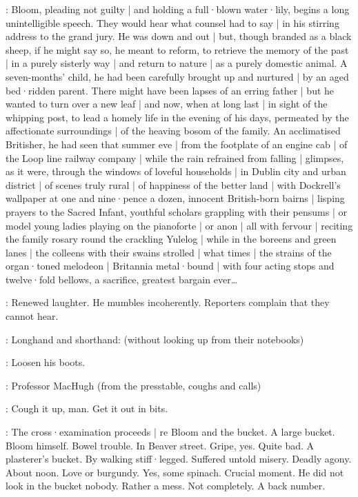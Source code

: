 :
Bloom,
pleading not guilty |
and holding a full·blown water·lily,
begins a long unintelligible speech.
They would hear what counsel had to say |
in his stirring address to the grand jury.
He was down and out |
but,
though branded as a black sheep,
if he might say so,
he meant to reform,
to retrieve the memory of the past |
in a purely sisterly way |
and return to nature |
as a purely domestic animal.
A seven-months' child,
he had been carefully brought up and nurtured |
by an aged bed·ridden parent.
There might have been lapses of an erring father |
but he wanted to turn over a new leaf |
and now,
when at long last |
in sight of the whipping post,
to lead a homely life in the evening of his days,
permeated by the affectionate surroundings |
of the heaving bosom of the family.
An acclimatised Britisher,
he had seen
that summer eve |
from the footplate of an engine cab |
of the Loop line railway company |
while the rain refrained from falling |
glimpses,
as it were,
through the windows of loveful households |
in Dublin city and urban district |
of scenes truly rural |
of happiness of the better land |
with Dockrell's wallpaper at one and nine·pence a dozen,
innocent British-born bairns |
lisping prayers to the Sacred Infant,
youthful scholars grappling with their pensums |
or model young ladies playing on the pianoforte |
or anon |
all with fervour |
reciting the family rosary round the crackling Yulelog |
while in the boreens and green lanes |
the colleens with their swains strolled |
what times |
the strains of the organ·toned melodeon |
Britannia metal·bound |
with four acting stops and twelve·fold bellows,
a sacrifice,
greatest bargain ever\ldots

:
Renewed laughter.
He mumbles incoherently.
Reporters complain that they cannot hear.

:
Longhand and shorthand:
(without looking up from their notebooks)

\LongShortHand:
Loosen his boots.

:
Professor MacHugh
(from the presstable, coughs and calls)

\MacHugh:
Cough it up,
man.
Get it out in bits.

:
The cross·examination proceeds |
re Bloom and the bucket.
A large bucket.
Bloom himself.
Bowel trouble.
In Beaver street.
Gripe,
yes.
Quite bad.
A plasterer's bucket.
By walking stiff·legged.
Suffered untold misery.
Deadly agony.
About noon.
Love or burgundy.
Yes,
some spinach.
Crucial moment.
He did not look in the bucket nobody.
Rather a mess.
Not completely.
A 
back number.

